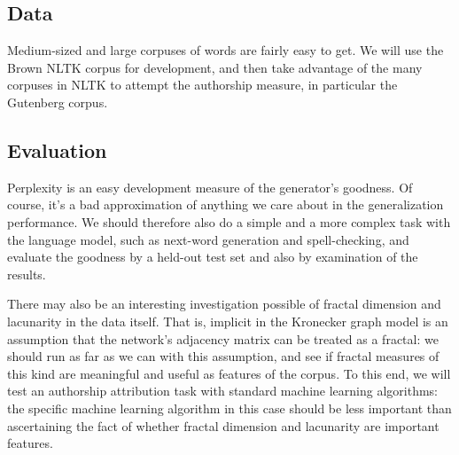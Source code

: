 \documentclass[12pt]{article}
\begin{document}
\subsection{Data}
Medium-sized and large corpuses of words are fairly easy to get. We will use the Brown NLTK corpus for development, and then take advantage of the many corpuses in NLTK to attempt the authorship measure, in particular the Gutenberg corpus.
\subsection{Evaluation}
Perplexity is an easy development measure of the generator's goodness. Of course, it's a bad approximation of anything we care about in the generalization performance. We should therefore also do a simple and a more complex task with the language model, such as next-word generation and spell-checking, and evaluate the goodness by a held-out test set and also by examination of the results.

There may also be an interesting investigation possible of fractal dimension and lacunarity in the data itself. That is, implicit in the Kronecker graph model is an assumption that the network's adjacency matrix can be treated as a fractal: we should run as far as we can with this assumption, and see if fractal measures of this kind are meaningful and useful as features of the corpus. To this end, we will test an authorship attribution task with standard machine learning algorithms: the specific machine learning algorithm in this case should be less important than ascertaining the fact of whether fractal dimension and lacunarity are important features. %

\begin{thebibliography}{99}
  \bibitem{} %
\end{thebibliography}

\end{document}
